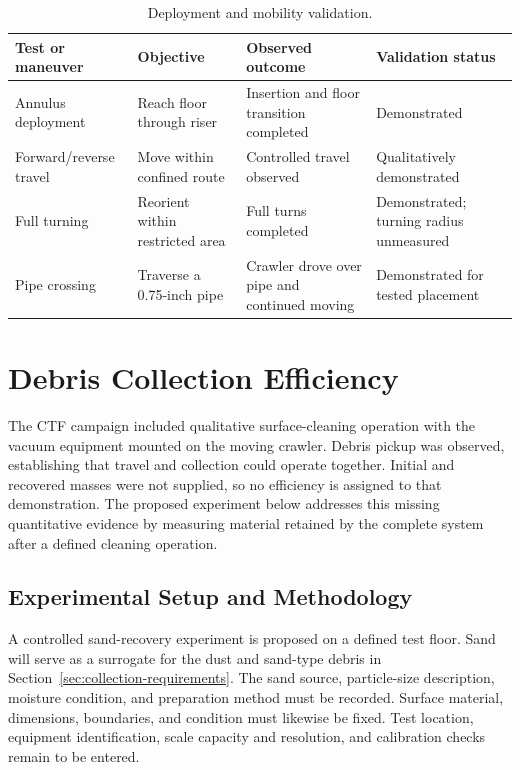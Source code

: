\begin{table}[H]\centering
\caption{Deployment and mobility validation.}
\label{tab:mobility-validation}
\begingroup\small\singlespacing\renewcommand{\arraystretch}{1.2}
\begin{tabularx}{\textwidth}{@{}XXXX@{}}\toprule
Test or maneuver & Objective & Observed outcome & Validation status \\\midrule
Annulus deployment & Reach floor through riser & Insertion and floor transition completed & Demonstrated \\
Forward/reverse travel & Move within confined route & Controlled travel observed & Qualitatively demonstrated \\
Full turning & Reorient within restricted area & Full turns completed & Demonstrated; turning radius unmeasured \\
Pipe crossing & Traverse a 0.75-inch pipe & Crawler drove over pipe and continued moving & Demonstrated for tested placement \\
\bottomrule\end{tabularx}\endgroup
\end{table}

\section{Debris Collection Efficiency}
\label{sec:recovery-tests}
The CTF campaign included qualitative surface-cleaning operation with the vacuum equipment mounted on the moving crawler. Debris pickup was observed, establishing that travel and collection could operate together. Initial and recovered masses were not supplied, so no efficiency is assigned to that demonstration. The proposed experiment below addresses this missing quantitative evidence by measuring material retained by the complete system after a defined cleaning operation.

\subsection{Experimental Setup and Methodology}
\label{sec:collection-method}
A controlled sand-recovery experiment is proposed on a defined test floor. Sand will serve as a surrogate for the dust and sand-type debris in Section~\ref{sec:collection-requirements}. The sand source, particle-size description, moisture condition, and preparation method must be recorded. Surface material, dimensions, boundaries, and condition must likewise be fixed. Test location, equipment identification, scale capacity and resolution, and calibration checks remain to be entered.

